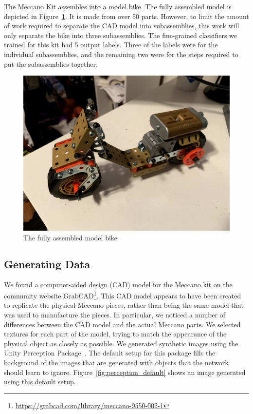 The Meccano Kit assembles into a model bike.
The fully assembled model is depicted in Figure~\ref{fig:full_bike}.
It is made from over 50 parts.
However, to limit the amount of work required to separate the CAD model into
subassemblies, this work will only separate the bike into three subassemblies.
The fine-grained classifiers we trained for this kit had 5 output labels.
Three of the labels were for the individual subassemblies, and the remaining two
were for the steps required to put the subassemblies together.

\begin{figure}
  \includegraphics[width=\columnwidth]{figures/synthetic/full_bike.jpg}
  \caption{
    The fully assembled model bike
  }\label{fig:full_bike}
\end{figure}

\subsection{Generating Data}

We found a computer-aided design (CAD) model for the Meccano kit on the
community website
GrabCAD\footnote{\url{https://grabcad.com/library/meccano-9550-002-1}}.
This CAD model appears to have been created to replicate the physical Meccano
pieces, rather than being the same model that was used to manufacture the
pieces.
In particular, we noticed a number of differences between the CAD model and the
actual Meccano parts.
We selected textures for each part of the model, trying to match the
appearance of the physical object as closely as possible.
We generated synthetic images using the Unity Perception Package~\cite{unity}.
The default setup for this package fills the background of the images that are
generated with objects that the network should learn to ignore.
Figure~\ref{fig:perception_default} shows an image generated using this default
setup.

